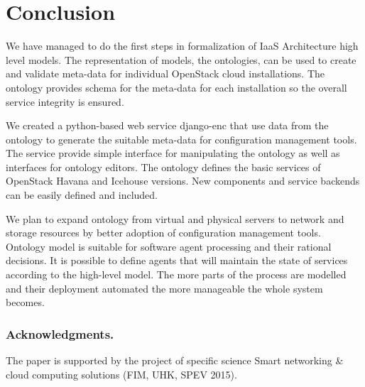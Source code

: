 
\section{Conclusion}

We have managed to do the first steps in formalization of IaaS Architecture high level models. The representation of models, the ontologies, can be used to create and validate meta-data for individual OpenStack cloud installations. The ontology provides schema for the meta-data for each installation so the overall service integrity is ensured.

We created a python-based web service django-enc that use data from the ontology to generate the suitable meta-data for configuration management tools. The service provide simple interface for manipulating the ontology as well as interfaces for ontology editors. The ontology defines the basic services of OpenStack Havana and Icehouse versions. New components and service backends can be easily defined and included.



We plan to expand  ontology from virtual and physical servers to network and storage resources by better adoption of configuration management tools. Ontology model is suitable for software agent processing and their rational decisions. It is possible to define agents that will maintain the state of services according to the high-level model. The more parts of the process are modelled and their deployment automated the more manageable the whole system becomes.

\subsubsection*{Acknowledgments.}
 
The paper is supported by the project of specific science Smart networking \& cloud computing solutions (FIM, UHK, SPEV 2015).
